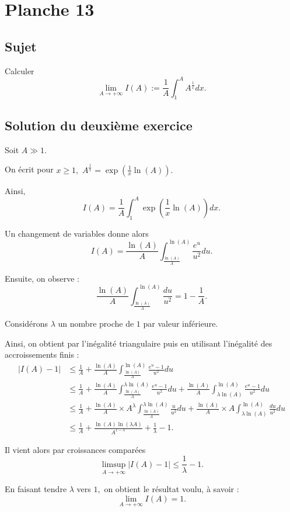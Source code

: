 \chapter{Planche 13}

\section{Sujet}

Calculer $$\lim_{A\rightarrow +\infty}I(A):=\frac{1}{A}\int_{1}^{A}A^{\frac{1}{x}}dx.$$

\section{Solution du deuxième exercice}

Soit $A\gg 1.$

On écrit pour $x\geq 1,$ $\displaystyle A^{\frac{1}{x}}=\exp(\frac{1}{x}\ln(A)).$

Ainsi, $$I(A)=\frac{1}{A}\int_{1}^{A}\exp(\frac{1}{x}\ln(A))dx.$$

Un changement de variables donne alors $$I(A)=\frac{\ln(A)}{A}\int_{\frac{\ln(A)}{A}}^{\ln(A)}\frac{e^{u}}{u^{2}}du.$$

Ensuite, on observe : $$\frac{\ln(A)}{A}\int_{\frac{\ln(A)}{A}}^{\ln(A)}\frac{du}{u^{2}}=1-\frac{1}{A}.$$

Considérons $\lambda$ un nombre proche de $1$ par valeur inférieure.

Ainsi, on obtient par l'inégalité triangulaire puis en utilisant l'inégalité des accroissements finis :
\begin{align*}
\vert I(A)-1 \vert  & \leq \frac{1}{A}+\frac{\ln(A)}{A}\int_{\frac{\ln(A)}{A}}^{\ln(A)}\frac{e^{u}-1}{u^{2}}du\\
& \leq \frac{1}{A}+\frac{\ln(A)}{A}\int_{\frac{\ln(A)}{A}}^{\lambda \ln(A)}\frac{e^{u}-1}{u^{2}}du+ \frac{\ln(A)}{A}\int_{\lambda \ln(A)}^{\ln(A)}\frac{e^{u}-1}{u^{2}}du\\
& \leq \frac{1}{A}+\frac{\ln(A)}{A}\times A^{\lambda}\int_{\frac{\ln(A)}{A}}^{\lambda \ln(A)}\frac{u}{u^{2}}du+ \frac{\ln(A)}{A}\times A \int_{\lambda \ln(A)}^{\ln(A)}\frac{du}{u^{2}}du\\
& \leq \frac{1}{A}+\frac{\ln(A)\ln(\lambda A)}{A^{1-\lambda}}+\frac{1}{\lambda}-1.
\end{align*}

Il vient alors par croissances comparées 
$$\limsup_{A\rightarrow +\infty} \vert I(A)-1\vert \leq \frac{1}{\lambda}-1.$$

En faisant tendre $\lambda$ vers $1,$ on obtient le résultat voulu, à savoir : $$\lim_{A\rightarrow +\infty} I(A)=1.$$
